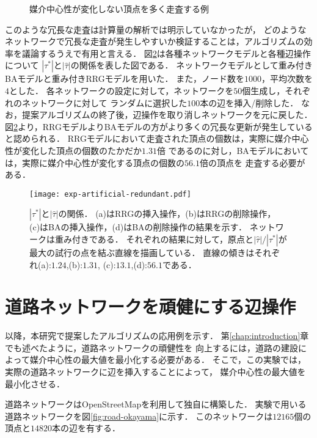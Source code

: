 \begin{figure}[tb]
  \centering
  \def\svgwidth{.8\linewidth}
  
  \caption{媒介中心性が変化しない頂点を多く走査する例}
  \label{fig:redundant-traverse-many}
\end{figure}

このような冗長な走査は計算量の解析では明示していなかったが，
どのようなネットワークで冗長な走査が発生しやすいか検証することは，アルゴリズムの効率を議論するうえで有用と言える．
図\ref{fig:exp-artificial-redundant}は各種ネットワークモデルと各種辺操作について
$|\tau^\ast|$と$|\hat{\tau}|$の関係を表した図である．
ネットワークモデルとして重み付きBAモデルと重み付きRRGモデルを用いた．
また，ノード数を$1000$，平均次数を$4$とした．
各ネットワークの設定に対して，ネットワークを$50$個生成し，それぞれのネットワークに対して
ランダムに選択した$100$本の辺を挿入/削除した．
なお，提案アルゴリズムの終了後，辺操作を取り消しネットワークを元に戻した．
図\ref{fig:exp-artificial-redundant}より，RRGモデルよりBAモデルの方がより多くの冗長な更新が発生していると認められる．
RRGモデルにおいて走査された頂点の個数は，実際に媒介中心性が変化した頂点の個数のたかだか$1.31$倍
であるのに対し，BAモデルにおいては，実際に媒介中心性が変化する頂点の個数の$56.1$倍の頂点を
走査する必要がある．

\begin{figure}
  \centering
  \texttt{[image: exp-artificial-redundant.pdf]}
  \caption{
    $|\tau^\ast|$と$|\hat{\tau}|$の関係．
    (a)はRRGの挿入操作，(b)はRRGの削除操作，
    (c)はBAの挿入操作，(d)はBAの削除操作の結果を示す．
    ネットワークは重み付きである．
    それぞれの結果に対して，原点と$|\hat{\tau}|/|\tau^\ast|$が
    最大の試行の点を結ぶ直線を描画している．
    直線の傾きはそれぞれ(a):$1.24$,(b):$1.31$,
    (c):$13.1$,(d):$56.1$である．
  }
  \label{fig:exp-artificial-redundant}
\end{figure}

\section{道路ネットワークを頑健にする辺操作}

以降，本研究で提案したアルゴリズムの応用例を示す．
第\ref{chap:introduction}章でも述べたように，道路ネットワークの頑健性を
向上するには，道路の建設によって媒介中心性の最大値を最小化する必要がある．
そこで，この実験では，実際の道路ネットワークに辺を挿入することによって，
媒介中心性の最大値を最小化させる．

道路ネットワークはOpenStreetMap\cite{OpenStreetMap}を利用して独自に構築した．
実験で用いる道路ネットワークを図\ref{fig:road-okayama}に示す．
このネットワークは$12165$個の頂点と$14820$本の辺を有する．

